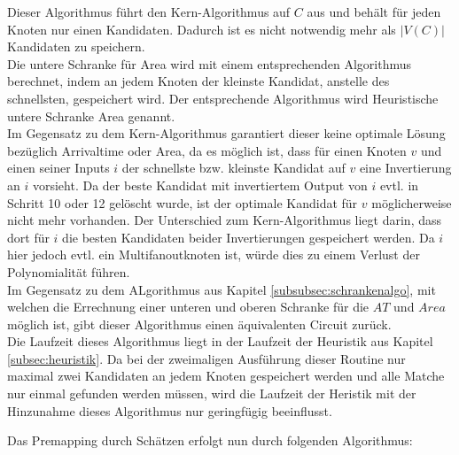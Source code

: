 \documentclass[11pt, a4paper, german]{article}
\begin{document}
Dieser Algorithmus führt den Kern-Algorithmus  auf $C$ aus und behält für jeden Knoten nur einen Kandidaten. Dadurch ist es nicht notwendig mehr als $|V(C)|$ Kandidaten zu speichern. \\
 Die untere Schranke für Area wird mit einem entsprechenden Algorithmus berechnet, indem an jedem Knoten der kleinste Kandidat, anstelle des schnellsten, gespeichert wird. Der entsprechende Algorithmus wird Heuristische untere Schranke Area genannt. \\
Im Gegensatz zu dem Kern-Algorithmus garantiert dieser keine optimale Lösung bezüglich Arrivaltime oder Area, da es möglich ist, dass für einen Knoten $v$ und einen seiner Inputs $i$ der schnellste bzw. kleinste Kandidat auf $v$ eine Invertierung an $i$ vorsieht. Da der beste Kandidat mit invertiertem Output von $i$ evtl. in Schritt 10  oder 12 gelöscht wurde, ist der optimale Kandidat für $v$ möglicherweise nicht mehr vorhanden. Der Unterschied zum Kern-Algorithmus liegt darin, dass dort für $i$ die besten Kandidaten beider Invertierungen gespeichert werden. Da $i$ hier jedoch evtl. ein Multifanoutknoten ist, würde dies zu einem Verlust der Polynomialität führen.\\
Im Gegensatz zu dem ALgorithmus aus Kapitel \ref{subsubsec:schrankenalgo}, mit welchen die Errechnung einer unteren und oberen Schranke f\"ur die $AT$ und $Area$ m\"oglich ist, gibt dieser Algorithmus einen \"aquivalenten Circuit zur\"uck.\\
Die Laufzeit dieses Algorithmus liegt in der Laufzeit der Heuristik aus Kapitel \ref{subsec:heuristik}. Da bei der zweimaligen Ausf\"uhrung dieser Routine nur maximal zwei Kandidaten an jedem Knoten gespeichert werden und alle Matche nur einmal gefunden werden müssen, wird die Laufzeit der Heristik mit der Hinzunahme dieses Algorithmus nur geringfügig beeinflusst.

Das Premapping durch Schätzen erfolgt nun durch folgenden Algorithmus:\\
 
\end{document}
